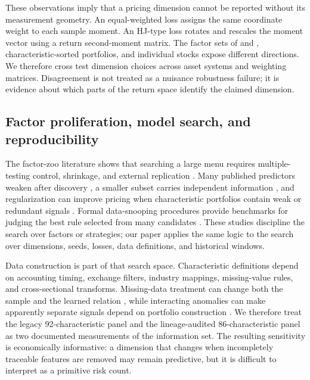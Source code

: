 These observations imply that a pricing dimension cannot be reported without its measurement geometry. An equal-weighted loss assigns the same coordinate weight to each sample moment. An HJ-type loss rotates and rescales the moment vector using a return second-moment matrix. The factor sets of \citet{fama1993common} and \citet{fama2015five}, characteristic-sorted portfolios, and individual stocks expose different directions. We therefore cross test dimension choices across asset systems and weighting matrices. Disagreement is not treated as a nuisance robustness failure; it is evidence about which parts of the return space identify the claimed dimension.

\subsection{Factor proliferation, model search, and reproducibility}

The factor-zoo literature shows that searching a large menu requires multiple-testing control, shrinkage, and external replication \citep{harvey2016cross,feng2020taming,hou2020replicating}. Many published predictors weaken after discovery \citep{mclean2016destroy}, a smaller subset carries independent information \citep{green2017characteristics}, and regularization can improve pricing when characteristic portfolios contain weak or redundant signals \citep{kozak2020shrinking}. Formal data-snooping procedures provide benchmarks for judging the best rule selected from many candidates \citep{white2000reality,hansen2005spa,romano2005stepwise}. These studies discipline the search over factors or strategies; our paper applies the same logic to the search over dimensions, seeds, losses, data definitions, and historical windows.

Data construction is part of that search space. Characteristic definitions depend on accounting timing, exchange filters, industry mappings, missing-value rules, and cross-sectional transforms. Missing-data treatment can change both the sample and the learned relation \citep{freyberger2025missing}, while interacting anomalies can make apparently separate signals depend on portfolio construction \citep{muller2025interacting}. We therefore treat the legacy 92-characteristic panel and the lineage-audited 86-characteristic panel as two documented measurements of the information set. The resulting sensitivity is economically informative: a dimension that changes when incompletely traceable features are removed may remain predictive, but it is difficult to interpret as a primitive risk count.

